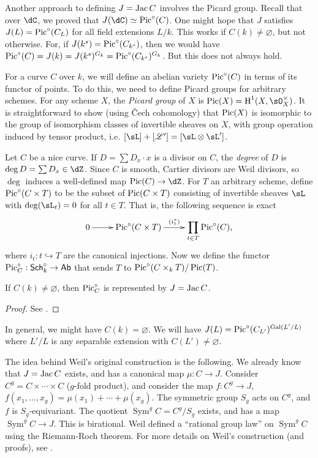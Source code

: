 \documentclass{article}
\begin{document}
Another approach to defining $J=\operatorname{Jac} C$ involves the Picard group. Recall 
that over $\dC$, we proved that $J(\dC)\simeq\picard^\circ(C)$. 
One might hope that $J$ satisfies $J(L)=\operatorname{Pic}^\circ(C_L)$ for all field 
extensions $L/k$. This works if $C(k)\ne\varnothing$, but not otherwise. For, 
if $J(k^s)=\operatorname{Pic}^\circ(C_{k^s})$, then we would have 
$\operatorname{Pic}^\circ(C) = J(k) = J(k^s)^{G_k} = \operatorname{Pic}^\circ(C_{k^s})^{G_k}$. But this 
does not always hold. 

For a curve $C$ over $k$, we will define an abelian variety $\operatorname{Pic}^\circ(C)$ in 
terms of its functor of points. To do this, we need to define Picard groups for 
arbitrary schemes. For any scheme $X$, the \emph{Picard group} of $X$ is 
$\picard(X)=\h^1(X,\sO_X^\times)$. It is straightforward to show (using \v Cech 
cohomology) that $\operatorname{Pic}(X)$ is isomorphic to the group of isomorphism classes of 
invertible sheaves on $X$, with group operation induced by tensor product, i.e. 
$[\sL] + [\mathscr{L'}] = [\sL\otimes \sL']$. 

Let $C$ be a nice curve. If $D=\sum D_x\cdot x$ is a divisor on $C$, the 
\emph{degree} of $D$ is $\deg D=\sum D_x\in \dZ$. Since $C$ is smooth, Cartier 
divisors are Weil divisors, so $\deg$ induces a well-defined map 
$\picard(C)\to \dZ$. For $T$ an arbitrary scheme, define 
$\operatorname{Pic}^\circ(C\times T)$ to be the subset of $\operatorname{Pic}(C\times T)$ consisting of 
invertible sheaves $\sL$ with $\deg(\sL_t)=0$ for all $t\in T$. That is, the 
following sequence is exact 
\[\xymatrix{
  0 \ar[r] 
    & \picard^\circ(C\times T) \ar[r]^-{(i_t^*)}
    & \displaystyle\prod_{t\in T} \picard^\circ (C)\text{,}
}\]
where $i_t:t\hookrightarrow T$ are the canonical injections. Now we define the 
functor $\operatorname{Pic}_C^\circ:\mathsf{Sch}_k^\circ\to\mathsf{Ab}$ that sends $T$ to 
$\operatorname{Pic}^\circ(C\times_k T)/\operatorname{Pic}(T)$. 

\begin{theorem}
If $C(k)\ne \varnothing$, then $\operatorname{Pic}_C^\circ$ is represented by $J=\operatorname{Jac} C$.
\end{theorem}
\begin{proof}
See \cite[III.1.2]{mi}.
\end{proof}

In general, we might have $C(k)=\varnothing$. We will have 
$J(L)=\operatorname{Pic}^\circ(C_{L'})^{\operatorname{Gal}(L'/L)}$ where $L'/L$ is any separable extension 
with $C(L')\ne\varnothing$. 

The idea behind Weil's original construction is the following. We already 
know that $J=\operatorname{Jac} C$ exists, and has a canonical map $\mu:C\to J$. Consider 
$C^g=C\times\cdots\times C$ ($g$-fold product), and consider the map 
$f:C^g\to J$, $f(x_1,\dotsc,x_g)=\mu(x_1)+\cdots+\mu(x_g)$. The symmetric 
group $S_g$ acts on $C^g$, and $f$ is $S_g$-equivariant. The quotient 
$\operatorname{Sym}^g C = C^g/S_g$ exists, and has a map 
$\operatorname{Sym}^g C\to J$. This is birational. Weil defined a ``rational 
group law'' on $\operatorname{Sym}^g C$ using the Riemann-Roch theorem. For 
more details on Weil's construction (and proofs), see \cite[III.7]{mi}. 
\end{document}
